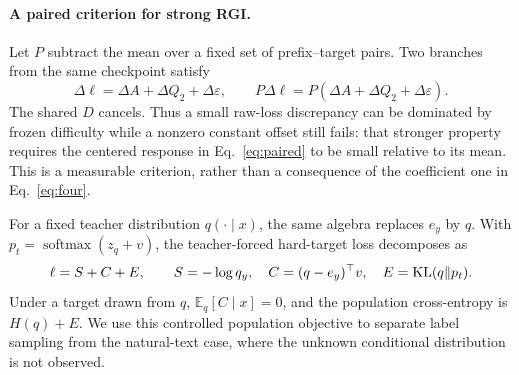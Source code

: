 \paragraph{A paired criterion for strong RGI.}
Let \(P\) subtract the mean over a fixed set of prefix--target pairs.  Two branches from the same checkpoint satisfy
\begin{equation}
  \Delta\ell=\Delta A+\Delta Q_2+\Delta\varepsilon,
  \qquad
  P\Delta\ell=P(\Delta A+\Delta Q_2+\Delta\varepsilon).
  \label{eq:paired}
\end{equation}
The shared \(D\) cancels.  Thus a small raw-loss discrepancy can be dominated by frozen difficulty while a nonzero constant offset still fails: that stronger property requires the centered response in Eq.~\eqref{eq:paired} to be small relative to its mean.  This is a measurable criterion, rather than a consequence of the coefficient one in Eq.~\eqref{eq:four}.

For a fixed teacher distribution \(q(\cdot\mid x)\), the same algebra replaces \(e_y\) by \(q\).  With \(p_t=\operatorname{softmax}(z_q+v)\), the teacher-forced hard-target loss decomposes as
\begin{equation}
  \ell=S+C+E,\qquad S=-\log q_y,\quad C=(q-e_y)^\top v,\quad E=\operatorname{KL}(q\Vert p_t).
  \label{eq:teacher}
\end{equation}
Under a target drawn from \(q\), \(\mathbb{E}_q[C\mid x]=0\), and the population cross-entropy is \(H(q)+E\).  We use this controlled population objective to separate label sampling from the natural-text case, where the unknown conditional distribution is not observed.
